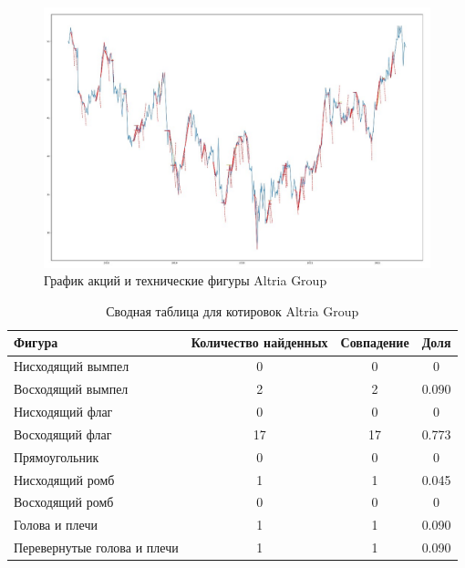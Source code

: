 \documentclass[bachelor, och, coursework]{SCWorks}
\begin{document}
        \begin{figure}[H]
            \centering
            \includegraphics[width=\textwidth]{pic/MO.jpg}
            \caption{График акций и технические фигуры Altria Group}
        \end{figure}
       
        \pagebreak

        \begin{table}[!hbt]
            \centering
            \caption{Сводная таблица для котировок Altria Group} 
            \begin{tabular}{|l|c|c|c|}
            \hline
            Фигура                      & \multicolumn{1}{l|}{Количество найденных} & Совпадение & Доля  \\ \hline
            Нисходящий вымпел           & 0                                         & 0          & 0     \\ \hline
            Восходящий вымпел           & 2                                         & 2          & 0.090 \\ \hline
            Нисходящий флаг             & 0                                         & 0          & 0     \\ \hline
            Восходящий флаг             & 17                                        & 17         & 0.773 \\ \hline
            Прямоугольник               & 0                                         & 0          & 0     \\ \hline
            Нисходящий ромб             & 1                                         & 1          & 0.045 \\ \hline
            Восходящий ромб             & 0                                         & 0          & 0     \\ \hline
            Голова и плечи              & 1                                         & 1          & 0.090 \\ \hline
            Перевернутые голова и плечи & 1                                         & 1          & 0.090 \\ \hline
            \end{tabular}
      
        \end{table}
    
\end{document}

